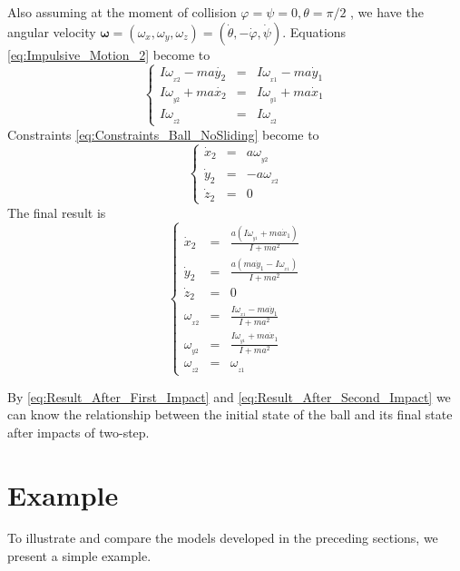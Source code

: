 \documentclass[preprint,12pt]{elsarticle}
\renewcommand{\vec}[1]{\boldsymbol{#1}}
\begin{document}
Also assuming at the moment of collision $\varphi=\psi=0, \theta=\pi/2$ , we have the angular velocity $\vec{\omega}=(\omega_x,\omega_y,\omega_z)=(\dot{\theta},-\dot{\varphi},\dot{\psi})$. Equations \eqref{eq:Impulsive_Motion_2} become to
\begin{equation}
\left\{\begin{array}{rcl}
    I\omega_{_{x2}}-ma\dot{y_2}&=&I\omega_{_{x1}}-ma\dot{y}_1\\
    I\omega_{_{y2}}+ma\dot{x_2}&=&I\omega_{_{y1}}+ma\dot{x}_1\\
    I\omega_{_{z2}}&=&I\omega_{_{z2}}
\end{array}\right.
\end{equation}
Constraints \eqref{eq:Constraints_Ball_NoSliding} become to
\begin{equation}
\left\{\begin{array}{rcl}
  \dot{x}_2&=&a\omega_{_{y2}}\\
  \dot{y}_2&=&-a\omega_{_{x2}}\\
  \dot{z}_2&=&0
  \end{array}\right.
\end{equation}
The final result is
\begin{equation}\label{eq:Result_After_Second_Impact}
\left\{\begin{array}{rcl}
    \dot{x}_2&=&\frac{a\left(I\omega_{_{y1}}+ma\dot{x}_1\right)}{I+ma^2} \\[6pt]
    \dot{y}_2&=&\frac{a\left(ma\dot{y}_1-I\omega_{_{x1}}\right)}{I+ma^2} \\[6pt]
    \dot{z}_2&=&0\\[6pt]
    \omega_{_{x2}}&=&\frac{I\omega_{_{x1}}-ma\dot{y}_1}{I+ma^2}\\[6pt]
    \omega_{_{y2}}&=&\frac{I\omega_{_{y1}}+ma\dot{x}_1}{I+ma^2}\\[6pt]
    \omega_{_{z2}}&=&\omega_{_{z1}}

  \end{array}\right.
\end{equation}

By \eqref{eq:Result_After_First_Impact} and \eqref{eq:Result_After_Second_Impact} we can know the relationship between the initial state of the ball and its final state after impacts of two-step.
\section{Example}
To illustrate and compare the models developed in the preceding sections, we present a simple example.
\end{document}

